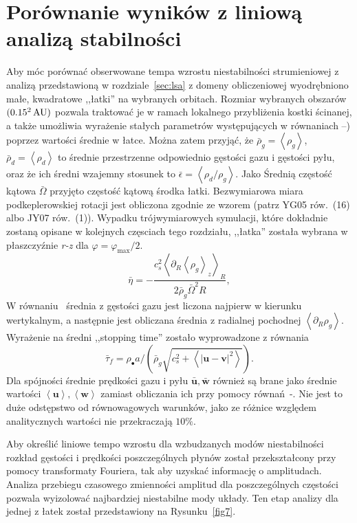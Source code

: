 \section{Porównanie wyników z liniową analizą stabilności}
Aby móc porównać obserwowane tempa wzrostu niestabilności strumieniowej z
analizą przedstawioną w rozdziale~\ref{sec:lsa} z domeny obliczeniowej
wyodrębniono małe, kwadratowe ,,łatki'' na wybranych orbitach. Rozmiar wybranych
obszarów $(0.15^2\hbox{$\thinspace\textrm{AU}$})$ pozwala traktować je w ramach lokalnego przybliżenia
kostki ścinanej, a także umożliwia wyrażenie stałych parametrów występujących w
równaniach --) poprzez wartości średnie w łatce.
Można zatem przyjąć, że $\bar{\rho}_g = \left<\rho_g\right>$, $\bar{\rho}_d =
\left<\rho_d\right>$ to średnie przestrzenne odpowiednio gęstości gazu i
gęstości pyłu, oraz że ich średni wzajemny stosunek to $\bar{\epsilon} =
\left<\rho_d / \rho_g\right>$. Jako Średnią częstość kątowa $\bar{\Omega}$
przyjęto częstość kątową środka łatki. Bezwymiarowa miara podkeplerowskiej
rotacji jest obliczona zgodnie ze wzorem (patrz YG05 rów.~(16) albo JY07
rów.~(1)).  Wypadku trójwymiarowych symulacji, które dokładnie zostaną opisane
w kolejnych częsciach tego rozdziału, ,,łatka'' została wybrana w
płaszczyźnie {\it r-z} dla $\varphi = \varphi_\textrm{max} / 2$.
%
\begin{equation}
   \bar{\eta} = -\frac{c_s^2\left<\partial_R \left<\rho_g\right>_z\right>_R}
      {2\bar{\rho}_g\bar{\Omega}^2 R},
   \label{eq:eta}
\end{equation}
%
W równaniu~ średnia z gęstości gazu jest liczona najpierw w
kierunku wertykalnym, a następnie jest obliczana średnia z radialnej pochodnej 
$\left<\partial_R \rho_g\right>$. Wyrażenie na średni ,,stopping time'' zostało
wyprowadzone z równania~
\begin{equation}
   \bar{\tau}_f = \rho_\bullet a / \left(\bar{\rho}_g \sqrt{c_s^2 +
   \left<\left|\mathbf{u} - \mathbf{v}\right|^2\right>} \right).
\end{equation}
%
Dla spójności średnie prędkości gazu i pyłu $\bar{\mathbf{u}},
\bar{\mathbf{w}}$ również są brane jako średnie wartości
$\left<\mathbf{u}\right>, \left<\mathbf{w}\right>$ zamiast obliczania ich przy
pomocy równań~-. Nie jest to duże odstępstwo od
równowagowych warunków, jako ze różnice względem analitycznych wartości nie
przekraczają $10\%$.
\par Aby określić liniowe tempo wzrostu dla wzbudzanych modów niestabilności
rozkład gęstości i prędkości poszczególnych płynów został przekształcony przy
pomocy transformaty Fouriera, tak aby uzyskać informację o amplitudach. Analiza
przebiegu czasowego zmienności amplitud dla poszczególnych częstości pozwala
wyizolować najbardziej niestabilne mody układy. Ten etap analizy dla jednej z
łatek został przedstawiony na Rysunku~\ref{fig7}.

